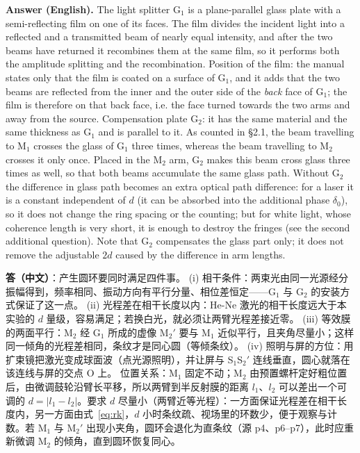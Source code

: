 \documentclass[11pt]{ctexart}
\newcommand{\Dl}{d}
\newcommand{\qaneed}[1]{\needspace{#1\textheight}}
\begin{document}
\textbf{Answer (English).} The light splitter G$_1$ is a plane-parallel glass plate with a semi-reflecting film on one of its faces. The film divides the incident light into a reflected and a transmitted beam of nearly equal intensity, and after the two beams have returned it recombines them at the same film, so it performs both the amplitude splitting and the recombination.
Position of the film: the manual states only that the film is coated on a surface of G$_1$, and it adds that the two beams are reflected from the inner and the outer side of the \emph{back} face of G$_1$; the film is therefore on that back face, i.e. the face turned towards the two arms and away from the source.
Compensation plate G$_2$: it has the same material and the same thickness as G$_1$ and is parallel to it. As counted in §2.1, the beam travelling to M$_1$ crosses the glass of G$_1$ three times, whereas the beam travelling to M$_2$ crosses it only once. Placed in the M$_2$ arm, G$_2$ makes this beam cross glass three times as well, so that both beams accumulate the same glass path. Without G$_2$ the difference in glass path becomes an extra optical path difference: for a laser it is a constant independent of $\Dl$ (it can be absorbed into the additional phase $\delta_0$), so it does not change the ring spacing or the counting; but for white light, whose coherence length is very short, it is enough to destroy the fringes (see the second additional question). Note that G$_2$ compensates the glass part only; it does not remove the adjustable $2\Dl$ caused by the difference in arm lengths.

\qaneed{0.72}


\textbf{答（中文）}：产生圆环要同时满足四件事。
(i) 相干条件：两束光由同一光源经分振幅得到，频率相同、振动方向有平行分量、相位差恒定——G$_1$ 与 G$_2$ 的安装方式保证了这一点。
(ii) 光程差在相干长度以内：He-Ne 激光的相干长度远大于本实验的 $\Dl$ 量级，容易满足；若换白光，就必须让两臂光程差接近零。
(iii) 等效膜的两面平行：M$_2$ 经 G$_1$ 所成的虚像 M$_2'$ 要与 M$_1$ 近似平行，且夹角尽量小；这样同一倾角的光程差相同，条纹才是同心圆（等倾条纹）。
(iv) 照明与屏的方位：用扩束镜把激光变成球面波（点光源照明），并让屏与 S$_1$S$_2'$ 连线垂直，圆心就落在该连线与屏的交点 O 上。
位置关系：M$_1$ 固定不动；M$_2$ 由预置螺杆定好粗位置后，由微调鼓轮沿臂长平移，所以两臂到半反射膜的距离 $l_1$、$l_2$ 可以差出一个可调的 $\Dl=|l_1-l_2|$。要求 $\Dl$ 尽量小（两臂近等光程）：一方面保证光程差在相干长度内，另一方面由式~\eqref{eq:rk}，$\Dl$ 小时条纹疏、视场里的环数少，便于观察与计数。若 M$_1$ 与 M$_2'$ 出现小夹角，圆环会退化为直条纹（源 p4、p6--p7），此时应重新微调 M$_2$ 的倾角，直到圆环恢复同心。
\end{document}
